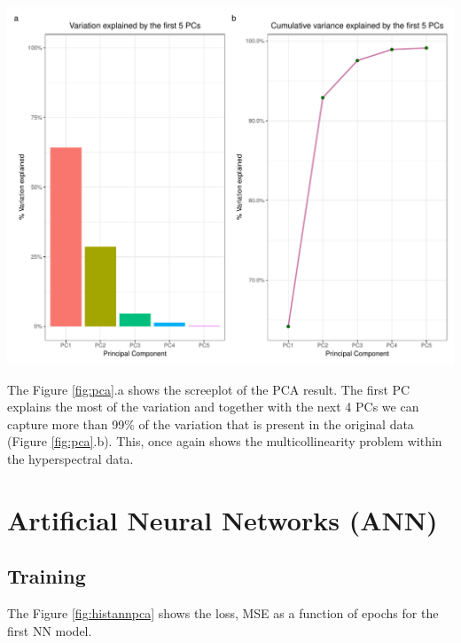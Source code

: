 \documentclass[a4paper, twoside]{templates/ociamthesis}
\let\origfigure\figure
\let\endorigfigure\endfigure
\renewenvironment{figure}[1][2] {
    \expandafter\origfigure\expandafter[H]
} {
    \endorigfigure
}
\begin{document}
\begin{figure}
\includegraphics[width=0.9\linewidth]{./figures/pca} \caption{Principal Component Analysis: a) Screeplot, b) Cumulative variance explained by the first 5 PCs}\label{fig:pca}
\end{figure}

The Figure \ref{fig:pca}.a shows the screeplot of the PCA result. The first PC explains the most of the variation and together with the next 4 PCs we can capture more than 99\% of the variation that is present in the original data (Figure \ref{fig:pca}.b). This, once again shows the multicollinearity problem within the hyperspectral data.

\newpage

\hypertarget{artificial-neural-networks-ann-1}{%
\section{Artificial Neural Networks (ANN)}\label{artificial-neural-networks-ann-1}}

\hypertarget{training}{%
\subsection{Training}\label{training}}

The Figure \ref{fig:histannpca} shows the loss, MSE as a function of epochs for the first NN model.
\end{document}
